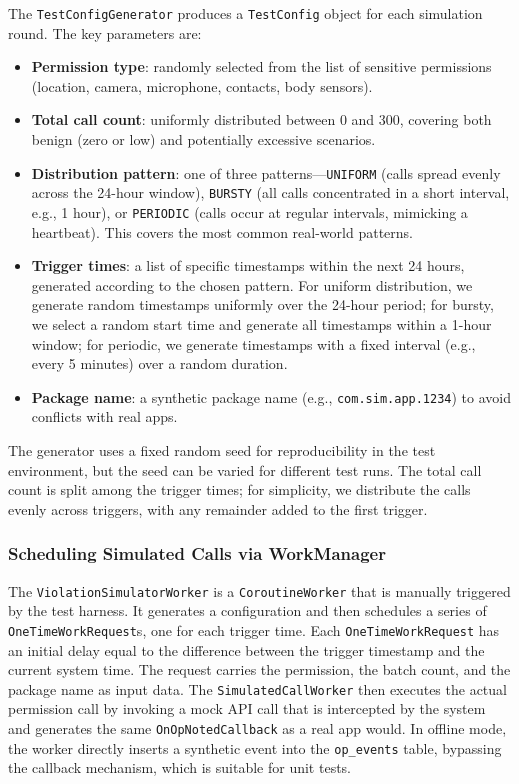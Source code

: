 The \texttt{TestConfigGenerator} produces a \texttt{TestConfig} object for each simulation round. The key parameters are:
\begin{itemize}
\item \textbf{Permission type}: randomly selected from the list of sensitive permissions (location, camera, microphone, contacts, body sensors).
\item \textbf{Total call count}: uniformly distributed between 0 and 300, covering both benign (zero or low) and potentially excessive scenarios.
\item \textbf{Distribution pattern}: one of three patterns—\texttt{UNIFORM} (calls spread evenly across the 24-hour window), \texttt{BURSTY} (all calls concentrated in a short interval, e.g., 1 hour), or \texttt{PERIODIC} (calls occur at regular intervals, mimicking a heartbeat). This covers the most common real-world patterns.
\item \textbf{Trigger times}: a list of specific timestamps within the next 24 hours, generated according to the chosen pattern. For uniform distribution, we generate random timestamps uniformly over the 24-hour period; for bursty, we select a random start time and generate all timestamps within a 1-hour window; for periodic, we generate timestamps with a fixed interval (e.g., every 5 minutes) over a random duration.
\item \textbf{Package name}: a synthetic package name (e.g., \texttt{com.sim.app.1234}) to avoid conflicts with real apps.
\end{itemize}

The generator uses a fixed random seed for reproducibility in the test environment, but the seed can be varied for different test runs. The total call count is split among the trigger times; for simplicity, we distribute the calls evenly across triggers, with any remainder added to the first trigger.

\subsubsection{Scheduling Simulated Calls via WorkManager}

The \texttt{ViolationSimulatorWorker} is a \texttt{CoroutineWorker} that is manually triggered by the test harness. It generates a configuration and then schedules a series of \texttt{OneTimeWorkRequest}s, one for each trigger time. Each \texttt{OneTimeWorkRequest} has an initial delay equal to the difference between the trigger timestamp and the current system time. The request carries the permission, the batch count, and the package name as input data. The \texttt{SimulatedCallWorker} then executes the actual permission call by invoking a mock API call that is intercepted by the system and generates the same \texttt{OnOpNotedCallback} as a real app would. In offline mode, the worker directly inserts a synthetic event into the \texttt{op\_events} table, bypassing the callback mechanism, which is suitable for unit tests.

